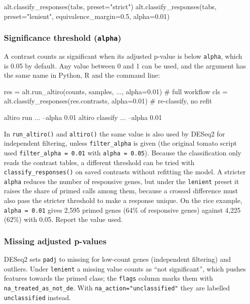 \documentclass[11pt,a4paper]{article}
\newcommand{\code}[1]{\texttt{\color{navy!85!black}#1}}
\begin{document}
\begin{pycode}
alt.classify_responses(tabs, preset="strict")
alt.classify_responses(tabs, preset="lenient", equivalence_margin=0.5, alpha=0.01)
\end{pycode}

\subsubsection*{Significance threshold (\code{alpha})}
A contrast counts as significant when its adjusted p-value is below \code{alpha}, which is 0.05 by
default. Any value between 0 and 1 can be used, and the argument has the same name in Python, R and
the command line:

\begin{pycode}
res = alt.run_altiro(counts, samples, ..., alpha=0.01)   # full workflow
cls = alt.classify_responses(res.contrasts, alpha=0.01)  # re-classify, no refit
\end{pycode}
\begin{shcode}
altiro run ... --alpha 0.01
altiro classify ... --alpha 0.01
\end{shcode}

In \code{run\_altiro()} and \code{altiro()} the same value is also used by DESeq2 for independent
filtering, unless \code{filter\_alpha} is given (the original tomato script used
\code{filter\_alpha = 0.01} with \code{alpha = 0.05}). Because the classification only reads the
contrast tables, a different threshold can be tried with \code{classify\_responses()} on saved
contrasts without refitting the model. A stricter \code{alpha} reduces the number of responsive
genes, but under the \code{lenient} preset it raises the share of primed calls among them, because a
crossed difference must also pass the stricter threshold to make a response unique. On the rice
example, \code{alpha = 0.01} gives 2,595 primed genes (64\% of responsive genes) against 4,225
(62\%) with 0.05. Report the value used.

\subsubsection*{Missing adjusted p-values}
DESeq2 sets \code{padj} to missing for low-count genes (independent filtering) and outliers. Under
\code{lenient} a missing value counts as ``not significant'', which pushes features towards
the primed class; the \code{flags} column marks them with \code{na\_treated\_as\_not\_de}. With
\code{na\_action="unclassified"} they are labelled \code{unclassified} instead.
\end{document}
